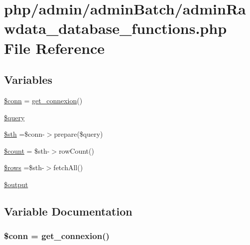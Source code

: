 \hypertarget{admin_batch_2admin_rawdata__database__functions_8php}{\section{php/admin/admin\-Batch/admin\-Rawdata\-\_\-database\-\_\-functions.php File Reference}
\label{admin_batch_2admin_rawdata__database__functions_8php}
}
\subsection*{Variables}
\begin{DoxyCompactItemize}
\item 
\hyperlink{admin_batch_2admin_rawdata__database__functions_8php_aa8a5a87b9c1a6a0819b88447cbe41877}{\$conn} = \hyperlink{php__functions_8php_ace18bc10f3fd08f92688ac743e0d8c2e}{get\-\_\-connexion}()
\item 
\hyperlink{admin_batch_2admin_rawdata__database__functions_8php_af59a5f7cd609e592c41dc3643efd3c98}{\$query}
\item 
\hyperlink{admin_batch_2admin_rawdata__database__functions_8php_afa9126f9664959c02795be300a135f93}{\$sth} =\$conn-\/$>$prepare(\$query)
\item 
\hyperlink{admin_batch_2admin_rawdata__database__functions_8php_af789423037bbc89dc7c850e761177570}{\$count} = \$sth-\/$>$row\-Count()
\item 
\hyperlink{admin_batch_2admin_rawdata__database__functions_8php_ace2ec39e7df3899fa8df9640ec274b03}{\$rows} =\$sth-\/$>$fetch\-All()
\item 
\hyperlink{admin_batch_2admin_rawdata__database__functions_8php_a73004ce9cd673c1bfafd1dc351134797}{\$output}
\end{DoxyCompactItemize}


\subsection{Variable Documentation}
\hypertarget{admin_batch_2admin_rawdata__database__functions_8php_aa8a5a87b9c1a6a0819b88447cbe41877}{
\subsubsection[{\$conn}]{\setlength{\rightskip}{0pt plus 5cm}\$conn = {\bf get\-\_\-connexion}()}}\label{admin_batch_2admin_rawdata__database__functions_8php_aa8a5a87b9c1a6a0819b88447cbe41877}


